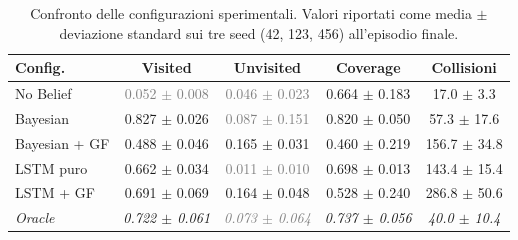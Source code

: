 \begin{table}[ht]
\centering
\caption{Confronto delle configurazioni sperimentali. Valori riportati come media $\pm$ deviazione standard sui tre seed (42, 123, 456) all'episodio finale.}
\label{tab:results_summary}
\begin{tabular}{lcccc}
\toprule
\textbf{Config.} & \textbf{Visited} & \textbf{Unvisited} & \textbf{Coverage} & \textbf{Collisioni} \\
\midrule
No Belief & \textcolor{gray}{0.052 $\pm$ 0.008} & \textcolor{gray}{0.046 $\pm$ 0.023} & 0.664 $\pm$ 0.183 & 17.0 $\pm$ 3.3 \\
Bayesian & 0.827 $\pm$ 0.026 & \textcolor{gray}{0.087 $\pm$ 0.151} & 0.820 $\pm$ 0.050 & 57.3 $\pm$ 17.6 \\
Bayesian + GF & 0.488 $\pm$ 0.046 & 0.165 $\pm$ 0.031 & 0.460 $\pm$ 0.219 & 156.7 $\pm$ 34.8 \\
LSTM puro & 0.662 $\pm$ 0.034 & \textcolor{gray}{0.011 $\pm$ 0.010} & 0.698 $\pm$ 0.013 & 143.4 $\pm$ 15.4 \\
LSTM + GF & 0.691 $\pm$ 0.069 & 0.164 $\pm$ 0.048 & 0.528 $\pm$ 0.240 & 286.8 $\pm$ 50.6 \\
\midrule
\textit{Oracle} & \textit{0.722 $\pm$ 0.061} & \textit{\textcolor{gray}{0.073 $\pm$ 0.064}} & \textit{0.737 $\pm$ 0.056} & \textit{40.0 $\pm$ 10.4} \\
\bottomrule
\end{tabular}
\end{table}